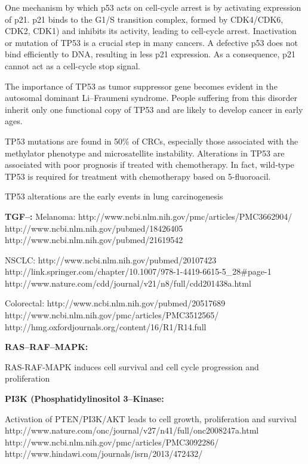       One mechanism by which p53 acts on cell-cycle arrest is by activating
      expression of p21. p21 binds to the G1/S transition complex, formed by
      CDK4/CDK6, CDK2, CDK1) and inhibits its activity, leading to cell-cycle
      arrest. Inactivation or mutation of TP53 is a crucial step in many
      cancers. A defective p53 does not bind efficiently to DNA, resulting in
      less p21 expression. As a consequence, p21 cannot act as a cell-cycle stop
      signal.

      The importance of TP53 as tumor suppressor gene becomes evident in the
      autosomal dominant Li--Fraumeni syndrome. People suffering from this disorder inherit only
      one functional copy of TP53 and are likely to develop cancer in early
      ages.

      TP53 mutations are found in 50\% of CRCs,
      especially those associated with the methylator phenotype and
      microsatellite instability. Alterations in TP53 are associated with poor
      prognosis if treated with chemotherapy. In fact, wild-type TP53 is
      required for treatment with chemotherapy based on 5-fluoroacil.

      TP53 alterations are the early events in lung carcinogenesis


      \textbf{TGF--\beta:}
      Melanoma: http://www.ncbi.nlm.nih.gov/pmc/articles/PMC3662904/
      http://www.ncbi.nlm.nih.gov/pubmed/18426405
      http://www.ncbi.nlm.nih.gov/pubmed/21619542

      NSCLC: http://www.ncbi.nlm.nih.gov/pubmed/20107423
      http://link.springer.com/chapter/10.1007/978-1-4419-6615-5_28#page-1
      http://www.nature.com/cdd/journal/v21/n8/full/cdd201438a.html

      Colorectal: http://www.ncbi.nlm.nih.gov/pubmed/20517689
      http://www.ncbi.nlm.nih.gov/pmc/articles/PMC3512565/
      http://hmg.oxfordjournals.org/content/16/R1/R14.full

      \textbf{RAS--RAF--MAPK:}

      RAS-RAF-MAPK induces cell survival and cell cycle progression and
      proliferation

      \textbf{PI3K (Phosphatidylinositol 3--Kinase:}

      Activation of
      PTEN/PI3K/AKT leads to cell growth, proliferation and survival
      http://www.nature.com/onc/journal/v27/n41/full/onc2008247a.html
      http://www.ncbi.nlm.nih.gov/pmc/articles/PMC3092286/
      http://www.hindawi.com/journals/isrn/2013/472432/

